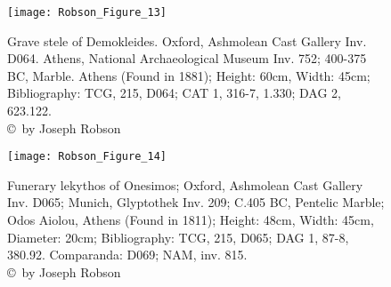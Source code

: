 \clearpage
\begin{figure}[!p]
	\texttt{[image: Robson\_Figure\_13]}

	\caption{Grave stele of Demokleides. Oxford, Ashmolean Cast Gallery Inv. D064. Athens, National Archaeological Museum Inv. 752; 400-375 BC, Marble. Athens (Found in 1881); Height: 60cm, Width: 45cm; Bibliography: TCG, 215, D064; CAT 1, 316-7, 1.330; DAG 2, 623.122.
		{\normalfont\scriptsize\\ \copyright\ by Joseph Robson}}
	\label{fig:Robson_Figure_13}
\end{figure}
\clearpage
\begin{figure}[!p]
	\texttt{[image: Robson\_Figure\_14]}

	\caption{Funerary lekythos of Onesimos; Oxford, Ashmolean Cast Gallery Inv. D065; Munich, Glyptothek Inv. 209; C.405 BC, Pentelic Marble; Odos Aiolou, Athens (Found in 1811); Height: 48cm, Width: 45cm, Diameter: 20cm; Bibliography: TCG, 215, D065; DAG 1, 87-8, 380.92.
		Comparanda: D069; NAM, inv. 815.
		{\normalfont\scriptsize \\ \copyright\ by Joseph Robson}}
	\label{fig:Robson_Figure_14}
\end{figure}
\clearpage
\IJSRAclosing%
